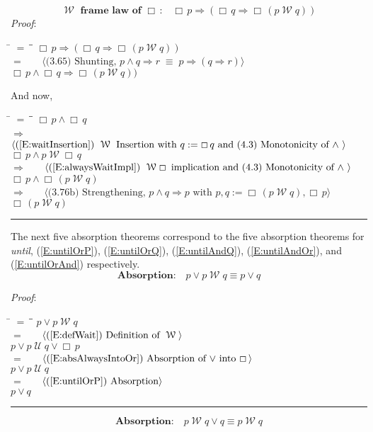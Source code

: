 \documentclass[12pt, fleqn, leqno]{article}
\newcommand{\lgap}{2pt}                             %
\newcommand{\mymathindent}{24pt}                    %
\newcommand{\equivs}{\ensuremath{\;\equiv\;}}       %
\newcommand{\impl}{\ensuremath{\Rightarrow}}        %
\newcommand{\Until}{\;\mathcal{U}\;}
\newcommand{\Wait}{\;\mathcal{W}\;}
\newcommand{\Always}{\Box\,}
\newcommand{\myqed}{\rule[-.23ex]{1.2ex}{2.0ex}}
\newcommand{\myqedtab}{\hspace{384pt}}              %
\newcommand{\Gll} {\langle}                         %
\newcommand{\Ggg} {\rangle}                         %
\newcommand{\Hint}[1]     {\ \ \ $\Gll              \mbox{#1} \Ggg$ }   %
\begin{document}
\begin{equation}\label{E:waitframelawAlways}
\textbf{$\Wait$ frame law of $\Always$:}\quad \Always p \impl (\Always q \impl \Always (p \Wait q))
\end{equation}
\emph{Proof}:
\begin{tabbing}
\hspace{\mymathindent} \= $= \;$ \= \myqedtab \= \kill
  \> \>   $\Always p \impl (\Always q \impl \Always (p \Wait q))$\\[\lgap]
  \> $=$  \>  \Hint{(3.65) Shunting, $p\land q\impl r\equivs p\impl (q\impl r)$}\\[\lgap]
  \> \>   $\Always p \land \Always q \impl \Always (p \Wait q))$
\end{tabbing}
And now,
\begin{tabbing}
\hspace{\mymathindent} \= $= \;$ \= \myqedtab \= \kill
  \> \>   $\Always p \land \Always q $\\[\lgap]
  \> $\impl$ \> \Hint{(\ref{E:waitInsertion}) $\Wait$ Insertion with $q:=\Always q$ and (4.3) Monotonicity of $\land$ } \\[\lgap]
  \> \>   $\Always p \land p \Wait \Always q $\\[\lgap]
   \> $\impl$ \> \Hint{(\ref{E:alwaysWaitImpl}) $\Wait\Always$ implication and (4.3) Monotonicity of $\land$  } \\[\lgap]
   \> \>   $\Always p \land \Always (p \Wait  q) $\\[\lgap]
  \> $\impl$ \> \Hint{(3.76b) Strengthening, $p\land q \impl p$ with $p,q := \Always (p \Wait q), \Always p$} \\[\lgap]
  \> \>   $\Always (p \Wait q) $\quad \myqed
\end{tabbing}


The next five absorption theorems correspond to the five absorption theorems for \textit{until},
(\ref{E:untilOrP}),
(\ref{E:untilOrQ}),
(\ref{E:untilAndQ}),
(\ref{E:untilAndOr}),
and
(\ref{E:untilOrAnd})
respectively.
\begin{equation}\label{E:waitOrP}
\textbf{Absorption:}\quad p\lor p\Wait q\equiv p\lor q
\end{equation}

\emph{Proof}:
\begin{tabbing}
\hspace{\mymathindent} \= $= \;$ \= \myqedtab \= \kill
\> \> $p\lor p\Wait q$\\[\lgap]
\> $=$ \> \Hint{(\ref{E:defWait}) Definition of $\Wait$} \\[\lgap]
\> \> $p\lor p \Until q\lor \Always p$\\[\lgap]
\> $=$ \> \Hint{(\ref{E:absAlwaysIntoOr}) Absorption of $\lor$ into $\Always$} \\[\lgap]
\> \> $p\lor p \Until q$\\[\lgap]
\> $=$ \> \Hint{(\ref{E:untilOrP}) Absorption} \\[\lgap]
\> \> $p\lor q$ \quad \myqed
\end{tabbing}
\begin{equation}\label{E:waitOrQ}
\textbf{Absorption:}\quad p\Wait q\lor q\equiv p\Wait q
\end{equation}
\end{document}
